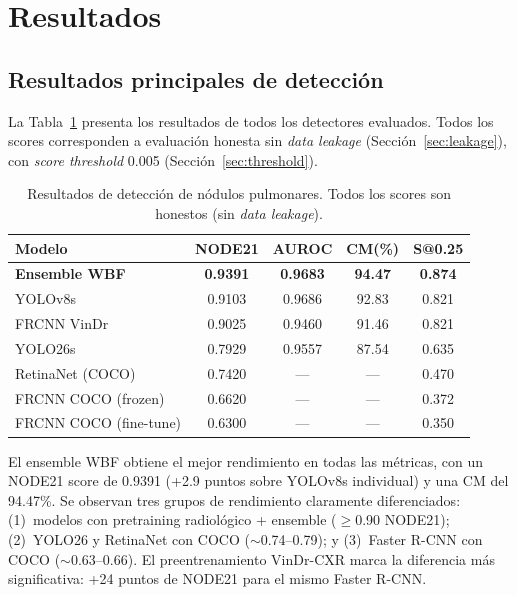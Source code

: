 \documentclass[conference]{IEEEtran}
\begin{document}
\section{Resultados}

\subsection{Resultados principales de detecci\'{o}n}

La Tabla~\ref{tab:deteccion} presenta los resultados de todos los detectores
evaluados. Todos los scores corresponden a evaluaci\'{o}n honesta sin
\textit{data leakage} (Secci\'{o}n~\ref{sec:leakage}), con \textit{score
threshold} 0.005 (Secci\'{o}n~\ref{sec:threshold}).

\begin{table}[t]
\caption{Resultados de detecci\'{o}n de n\'{o}dulos pulmonares. Todos los
scores son honestos (sin \textit{data leakage}).}
\label{tab:deteccion}
\centering
\footnotesize
\setlength{\tabcolsep}{2.5pt}
\begin{tabular}{lcccc}
\toprule
\textbf{Modelo} & \textbf{NODE21} & \textbf{AUROC} & \textbf{CM(\%)} & \textbf{S@0.25} \\
\midrule
\textbf{Ensemble WBF} & \textbf{0.9391} & \textbf{0.9683} & \textbf{94.47} & \textbf{0.874} \\
YOLOv8s                & 0.9103 & 0.9686 & 92.83 & 0.821 \\
FRCNN VinDr            & 0.9025 & 0.9460 & 91.46 & 0.821 \\
YOLO26s                & 0.7929 & 0.9557 & 87.54 & 0.635 \\
RetinaNet (COCO)       & 0.7420 & ---    & ---   & 0.470 \\
FRCNN COCO (frozen)    & 0.6620 & ---    & ---   & 0.372 \\
FRCNN COCO (fine-tune) & 0.6300 & ---    & ---   & 0.350 \\
\bottomrule
\end{tabular}
\end{table}

El ensemble WBF obtiene el mejor rendimiento en todas las m\'{e}tricas, con un
NODE21 score de 0.9391 (+2.9 puntos sobre YOLOv8s individual) y una CM del
94.47\%. Se observan tres grupos de rendimiento claramente diferenciados:
(1)~modelos con pretraining radiol\'{o}gico + ensemble ($\geq$0.90 NODE21);
(2)~YOLO26 y RetinaNet con COCO ($\sim$0.74--0.79); y (3)~Faster R-CNN con
COCO ($\sim$0.63--0.66). El preentrenamiento VinDr-CXR marca la diferencia
m\'{a}s significativa: +24 puntos de NODE21 para el mismo Faster R-CNN.
\end{document}
